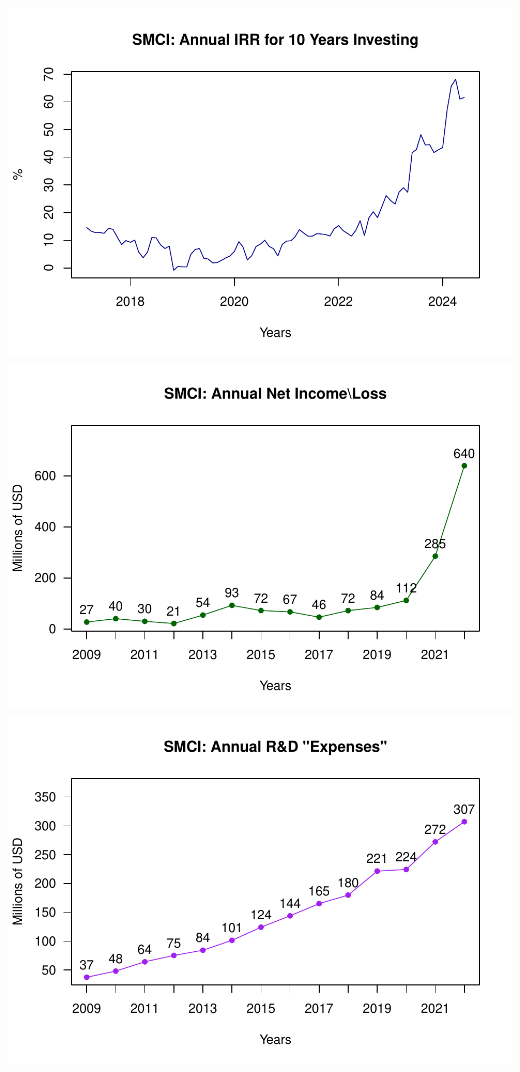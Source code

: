 \documentclass[
]{book}
\begin{document}
\includegraphics{_main_files/figure-latex/unnamed-chunk-1-6.pdf}
\includegraphics{_main_files/figure-latex/unnamed-chunk-1-7.pdf}
\includegraphics{_main_files/figure-latex/unnamed-chunk-1-8.pdf}
\end{document}
